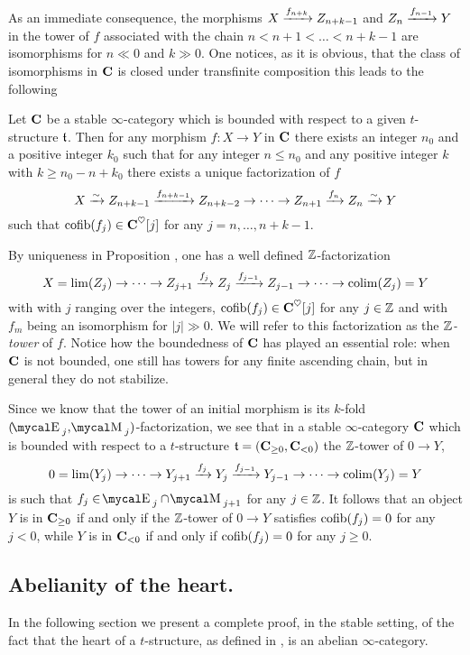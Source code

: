 As an immediate consequence, the morphisms $X \xrightarrow{f_{n+k}} Z_{n+k-1}$ and $Z_{n} \xrightarrow{f_{n-1}} Y$ in the tower of $f$ associated with the chain $n<n+1<\dots<n+k-1$ are isomorphisms for $n\ll 0$ and $k \gg 0$. One notices, as it is obvious, that the class of isomorphisms in $\textbf{C}$ is closed under transfinite composition this leads to the following
\begin{proposition}\label{prop.Z.Postnikov}
Let $\textbf{C}$ be a stable $\infty$\hyp{}category which is bounded with respect to a given $t$\hyp{}structure $\mathfrak{t}$. 
Then for any morphism $f\colon X\to Y$  in $\textbf{C}$ there exists an integer $n_0$ and a positive integer $k_0$ such that for any integer $n\leq n_0$ and any positive integer $k$ with $k\geq n_0-n+k_0$ there exists a unique factorization of $f$ 
\[
X \xrightarrow{\sim} Z_{n+k-1} \xrightarrow{f_{n+k-1}}Z_{n+k-2}\to\dots\to Z_{n+1} \xrightarrow{f_{n}} Z_{n} \xrightarrow{\sim} Y
\]
such that
$\text{cofib}(f_j)\in \textbf{C}^\heartsuit[j]$ for any $j=n,\dots,n+k-1$.
\end{proposition}
\begin{remark}\label{oss.Z.Postnikov}
By uniqueness in Proposition , one has a well defined $\mathbb{Z} $\hyp{}factorization
\[
X=\lim(Z_j) \to\cdots \to Z_{j+1} \xrightarrow{f_{j}} Z_{j} \xrightarrow{f_{j-1}}Z_{j-1}\to \cdots\to \mathrm{colim}(Z_j)=Y
\]
with 
with $j$ ranging over the integers, $\text{cofib}(f_j)\in \textbf{C}^\heartsuit[j]$ for any $j\in \mathbb{Z} $ and with $f_m$ being an isomorphism for $|j|\gg 0$. We will refer to this factorization as the \emph{$\mathbb{Z} $\hyp{}tower} of $f$. Notice how the boundedness of $\textbf{C}$ has played an essential role: when $\textbf{C}$ is not bounded, one still has towers for any finite ascending chain, but in general they do not stabilize.
\end{remark}
\begin{remark}\label{oss.for.Heart.to.t}
Since we know that the tower of an initial morphism is its $k$\hyp{}fold $(\EE_j,\MM_j)$\hyp{}factorization, we see that in a stable $\infty$\hyp{}category $\textbf{C}$ which is bounded with respect to a $t$\hyp{}structure $\mathfrak{t}=(\textbf{C}_{\geq 0},\textbf{C}_{<0})$ the $\mathbb{Z} $\hyp{}tower of $0\to Y$,
\[
0=\lim(Y_j) \to\cdots \to Y_{j+1} \xrightarrow{f_{j}} Y_{j} \xrightarrow{f_{j-1}}Y_{j-1}\to \cdots\to \mathrm{colim}(Y_j)=Y
\]
is such that $f_j\in \EE_j\cap\MM_{j+1}$ for any $j\in \mathbb{Z} $. It follows that an object $Y$ is in $\textbf{C}_{\geq 0}$ if and only if the $\mathbb{Z} $\hyp{}tower of $0\to Y$
satisfies $\text{cofib}(f_j)=0$ for any $j< 0$, while $Y$ is in $\textbf{C}_{<0}$ if and only if  $\text{cofib}(f_j)=0$ for any $j\geq 0$.
\end{remark}
\subsection{Abelianity of the heart.}
In the following section we present a complete proof, in the stable setting, of the fact that the heart of a $t$\hyp{}structure, as defined in \cite[Def. \textbf{1.2.1.11}]{LurieHA}, is an abelian $\infty$\hyp{}category. 


